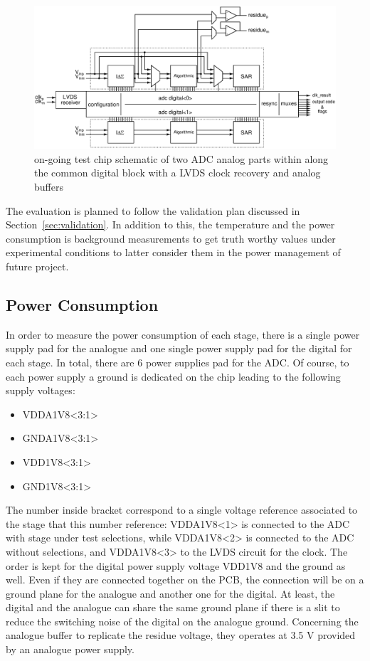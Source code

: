 \begin{figure}[htp]
    \centering
    \includegraphics[width=\textwidth]{Chapter5/Figs/adc_chip/top_adc_chip.ps}%
    \caption{on-going test chip schematic of two ADC analog parts within along the common digital block with a LVDS clock recovery and analog buffers}
    \label{fig:top-chip}
\end{figure}

The evaluation is planned to follow the validation plan discussed in Section~\ref{sec:validation}. In addition to this, the temperature and the power consumption is background measurements to get truth worthy values under experimental conditions to latter consider them in the power management of future project.

\subsection{Power Consumption}
In order to measure the power consumption of each stage, there is a single power supply pad for the analogue and one single power supply pad for the digital for each stage. In total, there are 6 power supplies pad for the ADC\@. Of course, to each power supply a ground is dedicated on the chip leading to the following supply voltages:
\begin{itemize}
    \item VDDA1V8<3:1> 
    \item GNDA1V8<3:1>
    \item VDD1V8<3:1>
    \item GND1V8<3:1>
\end{itemize}
The number inside bracket correspond to a single voltage reference associated to the stage that this number reference: VDDA1V8<1> is connected to the ADC with stage under test selections, while VDDA1V8<2> is connected to the ADC without selections, and VDDA1V8<3> to the LVDS circuit for the clock. The order is kept for the digital power supply voltage VDD1V8 and the ground as well.
Even if they are connected together on the PCB, the connection will be on a ground plane for the analogue and another one for the digital. At least, the digital and the analogue can share the same ground plane if there is a slit to reduce the switching noise of the digital on the analogue ground.
Concerning the analogue buffer to replicate the residue voltage, they operates at 3.5 V provided by an analogue power supply.

